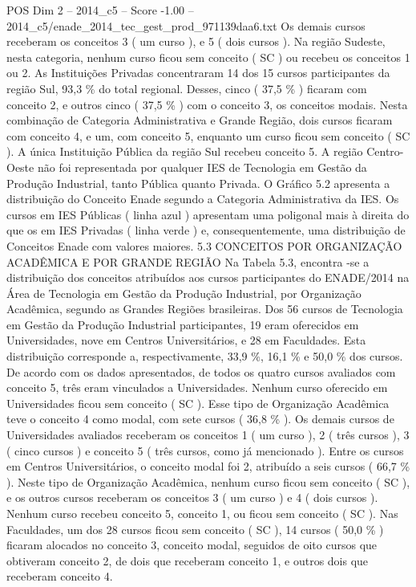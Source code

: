 \begin{textsample}{POS Dim 2 – 2014\_c5 – Score -1.00 – 2014\_c5/enade\_2014\_tec\_gest\_prod\_971139daa6.txt}
Os demais cursos receberam os conceitos 3 ( um curso ), e 5 ( dois cursos ).
Na região Sudeste, nesta categoria, nenhum curso ficou sem conceito ( SC ) ou recebeu os conceitos 1 ou 2.
As Instituições Privadas concentraram 14 dos 15 cursos participantes da região Sul, 93,3 \% do total regional.
Desses, cinco ( 37,5 \% ) ficaram com conceito 2, e outros cinco ( 37,5 \% ) com o conceito 3, os conceitos modais.
Nesta combinação de Categoria Administrativa e Grande Região, dois cursos ficaram com conceito 4, e um, com conceito 5, enquanto um curso ficou sem conceito ( SC ).
A única Instituição Pública da região Sul recebeu conceito 5.
A região Centro-Oeste não foi representada por qualquer IES de Tecnologia em Gestão da Produção Industrial, tanto Pública quanto Privada.
O Gráfico 5.2 apresenta a distribuição do Conceito Enade segundo a Categoria Administrativa da IES.
Os cursos em IES Públicas ( linha azul ) apresentam uma poligonal mais à direita do que os em IES Privadas ( linha verde ) e, consequentemente, uma distribuição de Conceitos Enade com valores maiores. 5.3 CONCEITOS POR ORGANIZAÇÃO ACADÊMICA E POR GRANDE REGIÃO Na Tabela 5.3, encontra -se a distribuição dos conceitos atribuídos aos cursos participantes do ENADE/2014 na Área de Tecnologia em Gestão da Produção Industrial, por Organização Acadêmica, segundo as Grandes Regiões brasileiras.
Dos 56 cursos de Tecnologia em Gestão da Produção Industrial participantes, 19 eram oferecidos em Universidades, nove em Centros Universitários, e 28 em Faculdades.
Esta distribuição corresponde a, respectivamente, 33,9 \%, 16,1 \% e 50,0 \% dos cursos.
De acordo com os dados apresentados, de todos os quatro cursos avaliados com conceito 5, três eram vinculados a Universidades.
Nenhum curso oferecido em Universidades ficou sem conceito ( SC ).
Esse tipo de Organização Acadêmica teve o conceito 4 como modal, com sete cursos ( 36,8 \% ).
Os demais cursos de Universidades avaliados receberam os conceitos 1 ( um curso ), 2 ( três cursos ), 3 ( cinco cursos ) e conceito 5 ( três cursos, como já mencionado ).
Entre os cursos em Centros Universitários, o conceito modal foi 2, atribuído a seis cursos ( 66,7 \% ).
Neste tipo de Organização Acadêmica, nenhum curso ficou sem conceito ( SC ), e os outros cursos receberam os conceitos 3 ( um curso ) e 4 ( dois cursos ).
Nenhum curso recebeu conceito 5, conceito 1, ou ficou sem conceito ( SC ).
Nas Faculdades, um dos 28 cursos ficou sem conceito ( SC ), 14 cursos ( 50,0 \% ) ficaram alocados no conceito 3, conceito modal, seguidos de oito cursos que obtiveram conceito 2, de dois que receberam conceito 1, e outros dois que receberam conceito 4.

\end{textsample}
